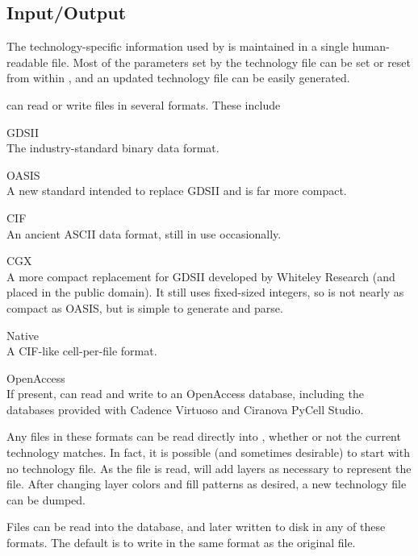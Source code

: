 \subsection{Input/Output}

The technology-specific information used by {\Xic} is maintained in a
single human-readable file.  Most of the parameters set by the
technology file can be set or reset from within {\Xic}, and an updated
technology file can be easily generated.

{\Xic} can read or write files in several formats.  These include

\begin{description}
\item{GDSII}\\
The industry-standard binary data format.

\item{OASIS}\\
A new standard intended to replace GDSII and is far more
compact.

\item{CIF}\\
An ancient ASCII data format, still in use occasionally.

\item{CGX}\\
A more compact replacement for GDSII developed by Whiteley Research
(and placed in the public domain).  It still uses fixed-sized
integers, so is not nearly as compact as OASIS, but is simple to
generate and parse.

\item{Native}\\
A CIF-like cell-per-file format.

\item{OpenAccess}\\
If present, {\Xic} can read and write to an OpenAccess database,
including the databases provided with Cadence Virtuoso and Ciranova
PyCell Studio.
\end{description}

Any files in these formats can be read directly into {\Xic}, whether
or not the current technology matches.  In fact, it is possible (and
sometimes desirable) to start {\Xic} with no technology file.  As the
file is read, {\Xic} will add layers as necessary to represent the
file.  After changing layer colors and fill patterns as desired, a new
technology file can be dumped.

Files can be read into the {\Xic} database, and later written to disk
in any of these formats.  The default is to write in the same format
as the original file.

